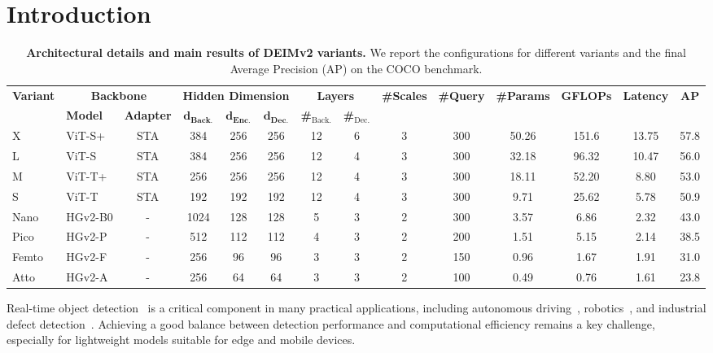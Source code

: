 \section{Introduction}


\begin{table}[t]
    \footnotesize
    \centering
    \renewcommand{\arraystretch}{1.05}
    \setlength{\tabcolsep}{5.5pt}
    \caption{
        \textbf{Architectural details and main results of DEIMv2 variants.} We report the configurations for different variants and the final Average Precision (AP) on the COCO benchmark.
    }
    \vspace*{-2mm}
    \begin{tabular*}{\textwidth}{l | lcccccccc | ccc | c}
        \toprule
        \hline
        \multirow{2}{*}{\textbf{Variant}} & \multicolumn{2}{c}{\textbf{Backbone}} & \multicolumn{3}{c}{\textbf{Hidden Dimension}} & \multicolumn{2}{c}{\textbf{Layers}}  & \multirow{2}{*}{\textbf{\#Scales}} & \multirow{2}{*}{\textbf{\#Query}}  & \multirow{2}{*}{\textbf{\#Params}} & \multirow{2}{*}{\textbf{GFLOPs}} & \multirow{2}{*}{\textbf{Latency}} & \multirow{2}{*}{\textbf{AP}} \\
        & \textbf{Model} & \textbf{Adapter} & $\mathbf{d_{Back.}}$ & $\mathbf{d_{Enc.}}$ & $\mathbf{d_{Dec.}}$ & \textbf{\#$_{\text{Back.}}$} & \textbf{\#$_{\text{Dec.}}$} & & & & & & \\
        \midrule
        \hline
        X & ViT-S+ & STA & 384 & 256 & 256 & 12 & 6 & 3 & 300 & 50.26 & 151.6 & 13.75 & 57.8 \\
        L & ViT-S & STA & 384 & 256 & 256 & 12 & 4 & 3 & 300 & 32.18 & 96.32 & 10.47 & 56.0 \\
        M & ViT-T+ & STA & 256 & 256 & 256 & 12 & 4 & 3 & 300 & 18.11 & 52.20 & 8.80 & 53.0 \\
        S & ViT-T  & STA & 192 & 192 & 192 & 12 & 4 & 3 & 300 & 9.71 & 25.62 & 5.78 & 50.9 \\
        \midrule
        Nano & HGv2-B0 & - & 1024 & 128 & 128 & 5 & 3 & 2 & 300 & 3.57 & 6.86 & 2.32 & 43.0 \\
        Pico & HGv2-P & - & 512 & 112 & 112 & 4 & 3 & 2 & 200 & 1.51 & 5.15 & 2.14 & 38.5 \\
        Femto & HGv2-F & - & 256 & 96 & 96 & 3 & 3 & 2 & 150 & 0.96 & 1.67 & 1.91 & 31.0 \\
        Atto & HGv2-A & - & 256 & 64 & 64 & 3 & 3 & 2 & 100 & 0.49 & 0.76 & 1.61 & 23.8 \\
        \bottomrule
    \end{tabular*}
    \label{tab:main}
\end{table}
Real-time object detection~\cite{redmon2016you,yolo11,tian2025yolov12,zhao2024detrs} is a critical component in many practical applications, including autonomous driving~\cite{liang2022edge}, robotics~\cite{maji2024yolo}, and industrial defect detection~\cite{hussain2023yolo}. Achieving a good balance between detection performance and computational efficiency remains a key challenge, especially for lightweight models suitable for edge and mobile devices. 


